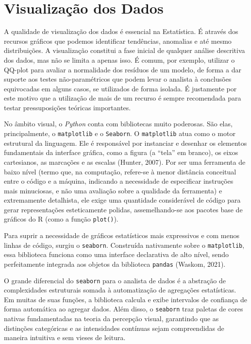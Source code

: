 \documentclass[
  brazilian,
  letterpaper,
  DIV=11,
  numbers=noendperiod]{scrreprt}
\begin{document}
\section{Visualização dos Dados}\label{visualizauxe7uxe3o-dos-dados}

A qualidade de visualização dos dados é essencial na Estatística. É
através dos recursos gráficos que podemos identificar tendências,
anomalias e até mesmo distribuições. A visualização constitui a fase
inicial de qualquer análise descritiva dos dados, mas não se limita a
apenas isso. É comum, por exemplo, utilizar o QQ-plot para avaliar a
normalidade dos resíduos de um modelo, de forma a dar suporte aos testes
não-paramétricos que podem levar o analista à conclusões equivocadas em
alguns casos, se utilizados de forma isolada. É justamente por este
motivo que a utilização de mais de um recurso é sempre recomendada para
testar pressuposições teóricas importantes.

No âmbito visual, o \emph{Python} conta com bibliotecas muito poderosas.
São elas, principalmente, o \texttt{matplotlib} e o \texttt{Seaborn}. O
\texttt{matplotlib} atua como o motor estrutural da linguagem. Ele é
responsável por instanciar e desenhar os elementos fundamentais da
interface gráfica, como a figura (a ``tela'' em branco), os eixos
cartesianos, as marcações e as escalas (Hunter, 2007). Por ser uma
ferramenta de baixo nível (termo que, na computação, refere-se à menor
distância conceitual entre o código e a máquina, indicando a necessidade
de especificar instruções mais minuciosas, e não uma avaliação sobre a
qualidade da ferramenta) e extremamente detalhista, ele exige uma
quantidade considerável de código para gerar representações
esteticamente polidas, assemelhando-se aos pacotes base de gráficos do R
(como a função \texttt{plot()}).

Para suprir a necessidade de gráficos estatísticos mais expressivos e
com menos linhas de código, surgiu o \texttt{seaborn}. Construída
nativamente sobre o \texttt{matplotlib}, essa biblioteca funciona como
uma interface declarativa de alto nível, sendo perfeitamente integrada
aos objetos da biblioteca \texttt{pandas} (Waskom, 2021).

O grande diferencial do \texttt{seaborn} para o analista de dados é a
abstração de complexidades estruturais somada à automatização de
agregações estatísticas. Em muitas de suas funções, a biblioteca calcula
e exibe intervalos de confiança de forma automática ao agregar dados.
Além disso, o \texttt{seaborn} traz paletas de cores nativas
fundamentadas na teoria da percepção visual, garantindo que as
distinções categóricas e as intensidades contínuas sejam compreendidas
de maneira intuitiva e sem vieses de leitura.
\end{document}
